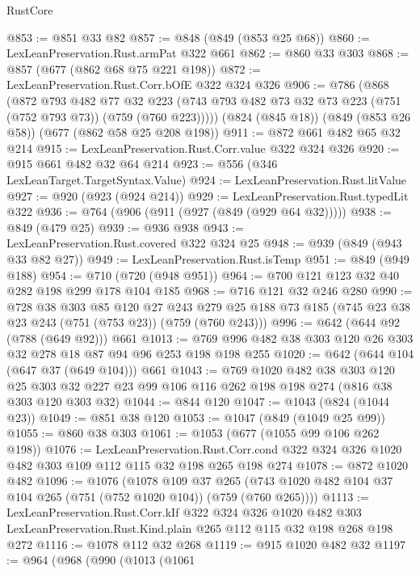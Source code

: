\begin{lexlean}{RustCore}
\begin{coremodule}
@853 := @851 @33 @82
@857 := @848 (@849 (@853 @25 @68))
@860 := LexLeanPreservation.Rust.armPat @322 @661
@862 := @860 @33 @303
@868 := @857 (@677 (@862 @68 @75 @221 @198))
@872 := LexLeanPreservation.Rust.Corr.bOfE @322 @324 @326
@906 := @786
    (@868
      (@872
        @793
        @482
        @77
        @32
        @223
        (@743 @793 @482 @73 @32 @73 @223 (@751 (@752 @793 @73)) (@759 (@760 @223)))))
    (@824 (@845 @18))
    (@849 (@853 @26 @58))
    (@677 (@862 @58 @25 @208 @198))
@911 := @872 @661 @482 @65 @32 @214
@915 := LexLeanPreservation.Rust.Corr.value @322 @324 @326
@920 := @915 @661 @482 @32 @64 @214
@923 := @556 (@346 LexLeanTarget.TargetSyntax.Value)
@924 := LexLeanPreservation.Rust.litValue
@927 := @920 (@923 (@924 @214))
@929 := LexLeanPreservation.Rust.typedLit @322
@936 := @764 (@906 (@911 (@927 (@849 (@929 @64 @32)))))
@938 := @849 (@479 @25)
@939 := @936 @938
@943 := LexLeanPreservation.Rust.covered @322 @324 @25
@948 := @939 (@849 (@943 @33 @82 @27))
@949 := LexLeanPreservation.Rust.isTemp
@951 := @849 (@949 @188)
@954 := @710 (@720 (@948 @951))
@964 := @700 @121 @123 @32 @40 @282 @198 @299 @178 @104 @185
@968 := @716 @121 @32 @246 @280
@990 := @728
    @38
    @303
    @85
    @120
    @27
    @243
    @279
    @25
    @188
    @73
    @185
    (@745 @23 @38 @23 @243 (@751 (@753 @23)) (@759 (@760 @243)))
@996 := @642 (@644 @92 (@788 (@649 @92))) @661
@1013 := @769 @996 @482 @38 @303 @120 @26 @303 @32 @278 @18 @87 @94 @96 @253 @198 @198 @255
@1020 := @642 (@644 @104 (@647 @37 (@649 @104))) @661
@1043 := @769
    @1020
    @482
    @38
    @303
    @120
    @25
    @303
    @32
    @227
    @23
    @99
    @106
    @116
    @262
    @198
    @198
    @274
    (@816 @38 @303 @120 @303 @32)
@1044 := @844 @120
@1047 := @1043 (@824 (@1044 @23))
@1049 := @851 @38 @120
@1053 := @1047 (@849 (@1049 @25 @99))
@1055 := @860 @38 @303
@1061 := @1053 (@677 (@1055 @99 @106 @262 @198))
@1076 := LexLeanPreservation.Rust.Corr.cond
    @322
    @324
    @326
    @1020
    @482
    @303
    @109
    @112
    @115
    @32
    @198
    @265
    @198
    @274
@1078 := @872 @1020 @482
@1096 := @1076
    (@1078
      @109
      @37
      @265
      (@743 @1020 @482 @104 @37 @104 @265 (@751 (@752 @1020 @104)) (@759 (@760 @265))))
@1113 := LexLeanPreservation.Rust.Corr.kIf
    @322
    @324
    @326
    @1020
    @482
    @303
    LexLeanPreservation.Rust.Kind.plain
    @265
    @112
    @115
    @32
    @198
    @268
    @198
    @272
@1116 := @1078 @112 @32 @268
@1119 := @915 @1020 @482 @32
@1197 := @964
    (@968
      (@990
        (@1013
          (@1061

\end{coremodule}
\end{lexlean}
